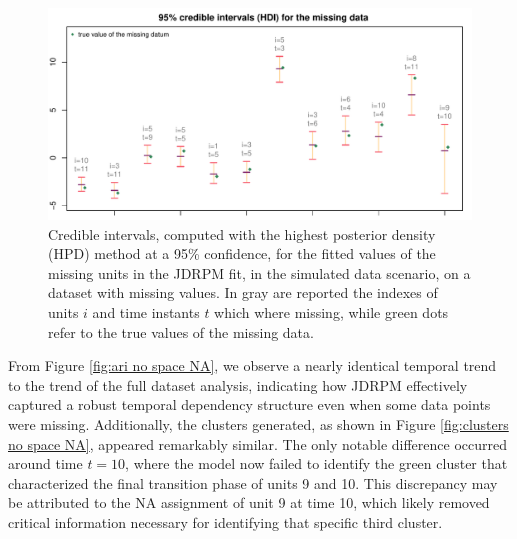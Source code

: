 \documentclass[12pt,	%
	a4paper,		%
	twoside,		%
	openright,		%
	titlepage,%
	]{book}
\theoremstyle{definition}
\begin{document}
\begin{figure}[!ht]
    \centering
    \includegraphics[width=1\linewidth]{Testing/NA data/no space NA/target_only_NA_CIs_SORTED.pdf}
    \caption[Credible intervals of JDRPM, simulated data scenario, dataset with missing values]{Credible intervals, computed with the highest posterior density (HPD) method at a 95\% confidence, for the fitted values of the missing units in the JDRPM fit, in the simulated data scenario, on a dataset with missing values. In gray are reported the indexes of units $i$ and time instants $t$ which where missing, while green dots refer to the true values of the missing data.}
    \label{fig: CIs target only}
\end{figure}

From Figure \ref{fig:ari no space NA}, we observe a nearly identical temporal trend to the trend of the full dataset analysis, indicating how JDRPM effectively captured a robust temporal dependency structure even when some data points were missing. Additionally, the clusters generated, as shown in Figure \ref{fig:clusters no space NA}, appeared remarkably similar. The only notable difference occurred around time $t=10$, where the model now failed to identify the green cluster that characterized the final transition phase of units 9 and 10. This discrepancy may be attributed to the NA assignment of unit 9 at time 10, which likely removed critical information necessary for identifying that specific third cluster.
\end{document}

